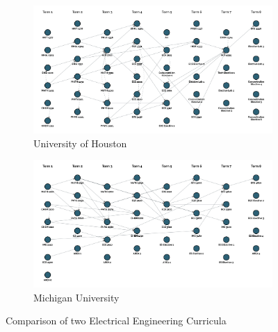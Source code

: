 \documentclass[botnum, fleqn]{unmeethesis}
\begin{document}
  \begin{figure}
    \centering
    \begin{subfigure}[h!]{.6\linewidth}
      \includegraphics[width=\linewidth]{./figures/UH.jpg}
      \caption{University of Houston}\label{fig:UH}
    \end{subfigure}

    \vspace{1cm}

    \begin{subfigure}[h!]{.6\linewidth}
      \includegraphics[width=\linewidth]{./figures/MU.jpg}
      \caption{Michigan University}\label{fig:MU}
    \end{subfigure}

    \caption{Comparison of two Electrical Engineering Curricula}
    \label{fig:comparison}
  \end{figure}
\end{document}
